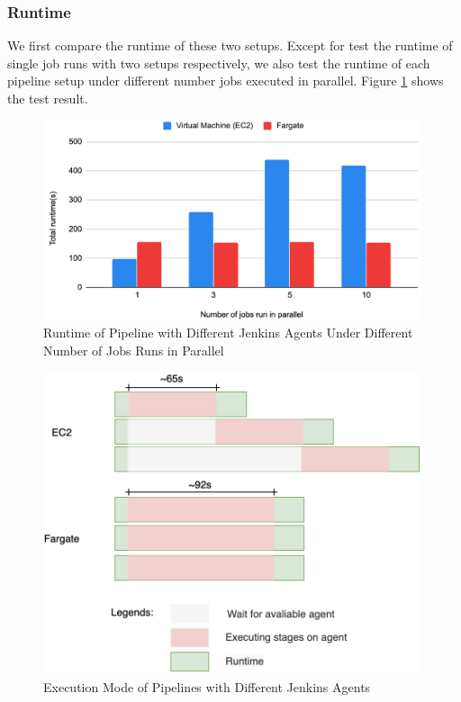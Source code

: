 \subsubsection{Runtime}
We first compare the runtime of these two setups. Except for test the runtime of single job runs with two setups respectively, we also test the runtime of each pipeline setup under different number jobs executed in parallel. Figure \ref{fig:runtime} shows the test result.
\begin{figure}[h]
\centering
\includegraphics[width=0.99\textwidth]{pics/runtime.png}
\caption{Runtime of Pipeline with Different Jenkins Agents Under Different Number of Jobs Runs in Parallel}
\label{fig:runtime}
\end{figure}
\begin{figure}[h]
\centering
\includegraphics[width=0.99\textwidth]{pics/parallel.png}
\caption{Execution Mode of Pipelines with Different Jenkins Agents}
\label{fig:parallel}
\end{figure}
